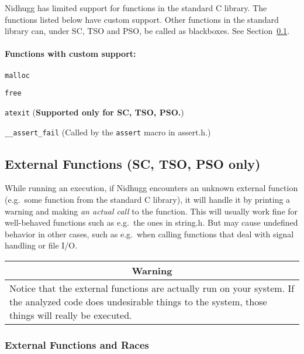 \documentclass[a4paper]{article}
\newcommand{\limitsupport}[1]{\textbf{Supported only for #1.}}
\begin{document}
Nidhugg has limited support for functions in the standard C
library. The functions listed below have custom support. Other
functions in the standard library can, under SC, TSO and PSO, be
called as blackboxes. See Section~\ref{sec:external:functions}.

\paragraph{Functions with custom support:}

\begin{description}
\item{\texttt{malloc}}
\item{\texttt{free}}
\item{\texttt{atexit}} (\limitsupport{SC, TSO, PSO})
\item{\texttt{\_\_assert\_fail}} (Called by the \texttt{assert} macro
  in \textsf{assert.h}.)
\end{description}

\subsection{External Functions (SC, TSO, PSO only)}\label{sec:external:functions}

While running an execution, if Nidhugg encounters an unknown external
function (e.g.\ some function from the standard C library), it will
handle it by printing a warning and making \emph{an actual call} to
the function. This will usually work fine for well-behaved functions
such as e.g.\ the ones in \textsf{string.h}. But may cause undefined
behavior in other cases, such as e.g.\ when calling functions that deal
with signal handling or file I/O.

\begin{center}
  \begin{tabular}{|p{.8\linewidth}|}
    \hline
    \multicolumn{1}{|c|}{\textbf{Warning}}\\
    \hline
    Notice that the external functions are actually run on your system. If
    the analyzed code does undesirable things to the system, those things
    will really be executed.\\
    \hline
  \end{tabular}
\end{center}

\subsubsection{External Functions and Races}\label{sec:stdlibc:races}
\end{document}
